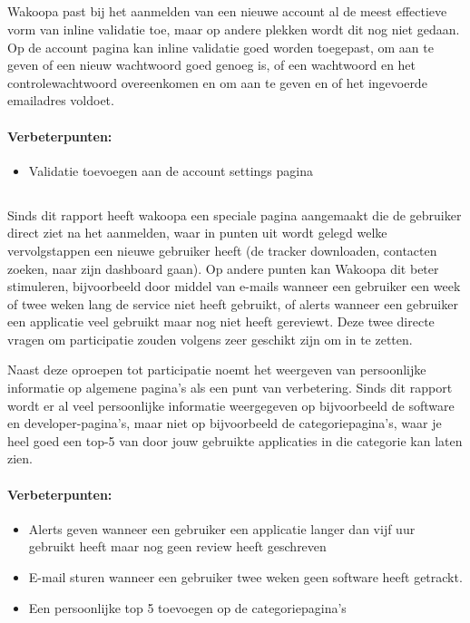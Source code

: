 \documentclass[a4paper, 10pt, pdftex]{report}
\begin{document}
    \subsection{\cite{Wroblewski2009}}
    Wakoopa past bij het aanmelden van een nieuwe account al de meest effectieve vorm van inline validatie toe, maar op andere plekken wordt dit nog niet gedaan. Op de account pagina kan inline validatie goed worden toegepast, om aan te geven of een nieuw wachtwoord goed genoeg is, of een wachtwoord en het controlewachtwoord overeenkomen en om aan te geven en of het ingevoerde emailadres voldoet.

      \paragraph{\textbf{Verbeterpunten:}}
      \begin{itemize}
        \item Validatie toevoegen aan de account settings pagina
      \end{itemize}

    \subsection{\cite{Alfrink2008}}
    Sinds dit rapport heeft wakoopa een speciale pagina aangemaakt die de gebruiker direct ziet na het aanmelden, waar in punten uit wordt gelegd welke vervolgstappen een nieuwe gebruiker heeft (de tracker downloaden, contacten zoeken, naar zijn dashboard gaan). Op andere punten kan Wakoopa dit beter stimuleren, bijvoorbeeld door middel van e-mails wanneer een gebruiker een week of twee weken lang de service niet heeft gebruikt, of alerts wanneer een gebruiker een applicatie veel gebruikt maar nog niet heeft gereviewt. Deze twee directe vragen om participatie zouden volgens \citeauthor{Alfrink2008} zeer geschikt zijn om in te zetten.

    Naast deze oproepen tot participatie noemt \citeauthor{Alfrink2008} het weergeven van persoonlijke informatie op algemene pagina's als een punt van verbetering. Sinds dit rapport wordt er al veel persoonlijke informatie weergegeven op bijvoorbeeld de software en developer-pagina's, maar niet op bijvoorbeeld de categoriepagina's, waar je heel goed een top-5 van door jouw gebruikte applicaties in die categorie kan laten zien.
    \paragraph{\textbf{Verbeterpunten:}}
      \begin{itemize}
        \item Alerts geven wanneer een gebruiker een applicatie langer dan vijf uur gebruikt heeft maar nog geen review heeft geschreven
        \item E-mail sturen wanneer een gebruiker twee weken geen software heeft getrackt.
        \item Een persoonlijke top 5 toevoegen op de categoriepagina's
      \end{itemize}
\end{document}
